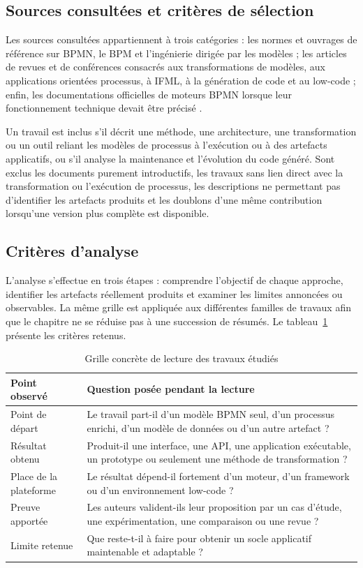 \subsection{Sources consultées et critères de sélection}

Les sources consultées appartiennent à trois catégories : les normes et ouvrages
de référence sur BPMN, le BPM et l'ingénierie dirigée par les modèles ; les
articles de revues et de conférences consacrés aux transformations de modèles,
aux applications orientées processus, à IFML, à la génération de code et au
low-code ; enfin, les documentations officielles de moteurs BPMN lorsque leur
fonctionnement technique devait être précisé
\cite{camunda2026modeler,flowable2026bpmn,jbpm2026docs,activiti2026docs}.

Un travail est inclus s'il décrit une méthode, une architecture, une
transformation ou un outil reliant les modèles de processus à l'exécution ou à
des artefacts applicatifs, ou s'il analyse la maintenance et l'évolution du code
généré. Sont exclus les documents purement introductifs, les travaux sans lien
direct avec la transformation ou l'exécution de processus, les descriptions ne
permettant pas d'identifier les artefacts produits et les doublons d'une même
contribution lorsqu'une version plus complète est disponible.

\subsection{Critères d'analyse}

L'analyse s'effectue en trois étapes : comprendre l'objectif de chaque approche,
identifier les artefacts réellement produits et examiner les limites annoncées
ou observables. La même grille est appliquée aux différentes familles de travaux
afin que le chapitre ne se réduise pas à une succession de résumés.
Le tableau~\ref{tab:chap2-grille-analyse} présente les critères retenus.
\begin{table}[H]
\centering
\caption{Grille concrète de lecture des travaux étudiés}
\label{tab:chap2-grille-analyse}
\begin{tabularx}{\textwidth}{p{3.2cm}X}
\toprule
\textbf{Point observé} & \textbf{Question posée pendant la lecture} \\
\midrule
Point de départ & Le travail part-il d'un modèle BPMN seul, d'un processus enrichi, d'un modèle de données ou d'un autre artefact ? \\
Résultat obtenu & Produit-il une interface, une API, une application exécutable, un prototype ou seulement une méthode de transformation ? \\
Place de la plateforme & Le résultat dépend-il fortement d'un moteur, d'un framework ou d'un environnement low-code ? \\
Preuve apportée & Les auteurs valident-ils leur proposition par un cas d'étude, une expérimentation, une comparaison ou une revue ? \\
Limite retenue & Que reste-t-il à faire pour obtenir un socle applicatif maintenable et adaptable ? \\
\bottomrule
\end{tabularx}
\end{table}

